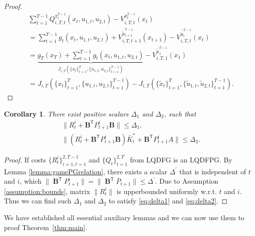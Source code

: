 \documentclass[letterpaper, 10 pt, conference]{ieeeconf}  %
\newcommand{\transpose}{\mathsf{T}}
\DeclareMathOperator{\contB}{\mathbf{B}}
\newtheorem{corollary}{Corollary}
\begin{document}
\begin{proof}
\begin{align*}
    &\sum_{t=1}^{T-1} Q_{i,T,t}^{\bar{\pi}_{t}^{T-1}}(x_{t},u_{1,t},u_{2,t}) -  V_{i,T,t}^{\bar{\pi}_{t}^{T-1}}(x_{t}) \\
    &= \sum_{t=1}^{T-1} g_{t}(x_{t},u_{1,t},u_{2,t})+ V_{i,T,t+1}^{\bar{\tilde{\pi}}_{t+1}^{T-1}}(x_{t+1})-V_{i,T,t}^{\bar{\tilde{\pi}}_{t}^{T-1}}(x_{t})\\
    &= \underbrace{g_{T}(x_{T}) + \sum_{t=1}^{T-1} g_{t}(x_{t},u_{1,t},u_{2,t})}_{J_{i,T}(\{x_{t}\}_{t=1}^{T},\{u_{1,t},u_{2,t}\}_{t=1}^{T-1})} - V_{i,T,1}^{\bar{\tilde{\pi}}_{1}^{T-1}}(x_{1})\\
    &= J_{i,T}(\{x_{t}\}_{t=1}^{T},\{u_{1,t},u_{2,t}\}_{t=1}^{T-1}) - J_{i,T}(\{\tilde{x}_{t}\}_{t=1}^{T},\{\tilde{u}_{1,t},\tilde{u}_{2,t}\}_{t=1}^{T-1}).
\end{align*}
\end{proof}


\begin{corollary}\label{corollary:Delta}
    There exist positive scalars $\Delta_{1}$ and $\Delta_{2}$, such that
    \begin{align}
    \label{eq:delta1}
        &\|R_{t}^{i}+\mathbf{B}^{\transpose}P_{t+1}^{i}\mathbf{B}\| \leq \Delta_{1},\\
        \label{eq:delta2}
        &\|(R_{t}^{i}+\mathbf{B}^{\transpose}P_{t+1}^{i}\mathbf{B})\bar{K}_{t}^{*}+\mathbf{B}^{\transpose}P_{t+1}^{i}A\| \leq \Delta_{2}.
    \end{align}
\end{corollary}
\begin{proof}
    If costs $\{R_{t}^{i}\}_{i=1,t=1}^{2,T-1}$ and $\{Q_{t}\}_{t=1}^{2,T}$ from LQDFG is an LQDFPG. By Lemma \ref{lemma:gamePGrelation}, there exists a scalar $\Delta^{'}$ that is independent of $t$ and $i$, which $
        \|\contB^{\transpose}P_{t+1}^{i}\| = \|\contB^{\transpose}\bar{P}_{t+1}\| \leq \Delta^{'}$. 
    Due to Assumption \ref{assumption:bounds}, matrix $\|R_{t}^{i}\|$ is upperbounded uniformly w.r.t. $t$ and $i$. Thus we can find such $\Delta_{1}$ and $\Delta_{2}$ to satisfy  \eqref{eq:delta1} and \eqref{eq:delta2}.
\end{proof}
We have established all essential auxiliary lemmas and we can now use them to proof Theorem~\ref{thm:main}.
\end{document}
